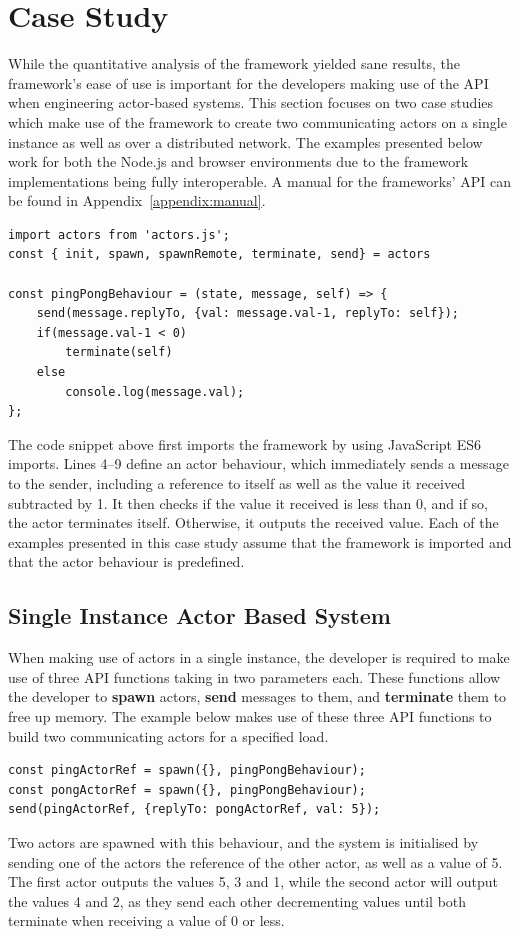 \documentclass[oneside]{um-fict}
\begin{document}
\section{Case Study}
While the quantitative analysis of the framework yielded sane results, the framework's ease of use is important for the developers making use of the API when engineering actor-based systems. This section focuses on two case studies which make use of the framework to create two communicating actors on a single instance as well as over a distributed network. The examples presented below work for both the Node.js and browser environments due to the framework implementations being fully interoperable. A manual for the frameworks' API can be found in Appendix~\ref{appendix:manual}.
\newpage
\begin{lstlisting}    
import actors from 'actors.js';
const { init, spawn, spawnRemote, terminate, send} = actors

const pingPongBehaviour = (state, message, self) => {
    send(message.replyTo, {val: message.val-1, replyTo: self});
    if(message.val-1 < 0)
        terminate(self)
    else    
        console.log(message.val);
};
\end{lstlisting}
The code snippet above first imports the framework by using JavaScript ES6 imports. Lines 4--9 define an actor behaviour, which immediately sends a message to the sender, including a reference to itself as well as the value it received subtracted by 1. It then checks if the value it received is less than 0, and if so, the actor terminates itself. Otherwise, it outputs the received value. Each of the examples presented in this case study assume that the framework is imported and that the actor behaviour is predefined. 
\subsection{Single Instance Actor Based System}
When making use of actors in a single instance, the developer is required to make use of three API functions taking in two parameters each. These functions allow the developer to \textbf{spawn} actors, \textbf{send} messages to them, and \textbf{terminate} them to free up memory. The example below makes use of these three API functions to build two communicating actors for a specified load.
\begin{lstlisting}    
const pingActorRef = spawn({}, pingPongBehaviour);
const pongActorRef = spawn({}, pingPongBehaviour);
send(pingActorRef, {replyTo: pongActorRef, val: 5});
\end{lstlisting}
Two actors are spawned with this behaviour, and the system is initialised by sending one of the actors the reference of the other actor, as well as a value of 5. The first actor outputs the values 5, 3 and 1, while the second actor will output the values 4 and 2, as they send each other decrementing values until both terminate when receiving a value of 0 or less.
\end{document}
